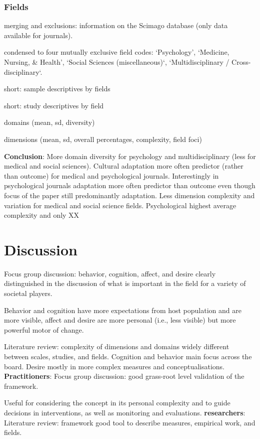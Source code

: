 \documentclass[man, 12pt, a4paper]{apa7}
\begin{document}
\subsubsection{Fields}
merging and exclusions: information on the Scimago database (only data available for journals).

condensed to four mutually exclusive field codes: ‘Psychology’, ‘Medicine, Nursing, \& Health’, ‘Social Sciences (miscellaneous)‘, ‘Multidisciplinary / Cross-disciplinary‘.

short: sample descriptives by fields

short: study descriptives by field

domains (mean, sd, diversity)

dimensions (mean, sd, overall percentages, complexity, field foci)

\textbf{Conclusion}: More domain diversity for psychology and multidisciplinary (less for medical and social sciences). Cultural adaptation more often predictor (rather than outcome) for medical and psychological journals. Interestingly in psychological journals adaptation more often predictor than outcome even though focus of the paper still predominantly adaptation. Less dimension complexity and variation for medical and social science fields. Psychological highest average complexity and only XX%

\section{Discussion}
Focus group discussion: behavior, cognition, affect, and desire clearly distinguished in the discussion of what is important in the field for a variety of societal players.

Behavior and cognition have more expectations from host population and are more visible, affect and desire are more personal (i.e., less visible) but more powerful motor of change.

Literature review: complexity of dimensions and domains widely different between scales, studies, and fields. Cognition and behavior main focus across the board. Desire mostly in more complex measures and conceptualisations.
\textbf{Practitioners}: Focus group discussion: good grass-root level validation of the framework.

Useful for considering the concept in its personal complexity and to guide decisions in interventions, as well as monitoring and evaluations. 
\textbf{researchers}: Literature review: framework good tool to describe measures, empirical work, and fields.
\end{document}
